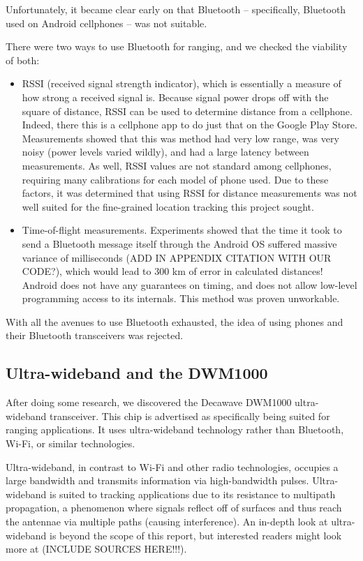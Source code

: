 Unfortunately, it became clear early on that Bluetooth -- specifically, Bluetooth used on Android cellphones -- was not suitable. 

There were two ways to use Bluetooth for ranging, and we checked the viability of both: 

\begin{itemize}
	\item RSSI (received signal strength indicator), which is essentially a measure of how strong a received signal is. Because signal power drops off with the square of distance, RSSI can be used to determine distance from a cellphone. Indeed, there this is a cellphone app to do just that on the Google Play Store. Measurements showed that this was method had very low range, was very noisy (power levels varied wildly), and had a large latency between measurements. As well, RSSI values are not standard among cellphones, requiring many calibrations for each model of phone used. Due to these factors, it was determined that using RSSI for distance measurements was not well suited for the fine-grained location tracking this project sought. 
	\item Time-of-flight measurements. Experiments showed that the time it took to send a Bluetooth message itself through the Android OS suffered massive variance of milliseconds (ADD IN APPENDIX CITATION WITH OUR CODE?), which would lead to 300 km of error in calculated distances! Android does not have any guarantees on timing, and does not allow low-level programming access to its internals. This method was proven unworkable.
\end{itemize}

With all the avenues to use Bluetooth exhausted, the idea of using phones and their Bluetooth transceivers was rejected.

\subsection{Ultra-wideband and the DWM1000}
After doing some research, we discovered the Decawave DWM1000 ultra-wideband transceiver. This chip is advertised as specifically being suited for ranging applications. It uses ultra-wideband technology rather than Bluetooth, Wi-Fi, or similar technologies.

Ultra-wideband, in contrast to Wi-Fi and other radio technologies, occupies a large bandwidth and transmits information via high-bandwidth pulses. Ultra-wideband is suited to tracking applications due to its resistance to multipath propagation, a phenomenon where signals reflect off of surfaces and thus reach the antennae via multiple paths (causing interference). An in-depth look at ultra-wideband is beyond the scope of this report, but interested readers might look more at (INCLUDE SOURCES HERE!!!).

